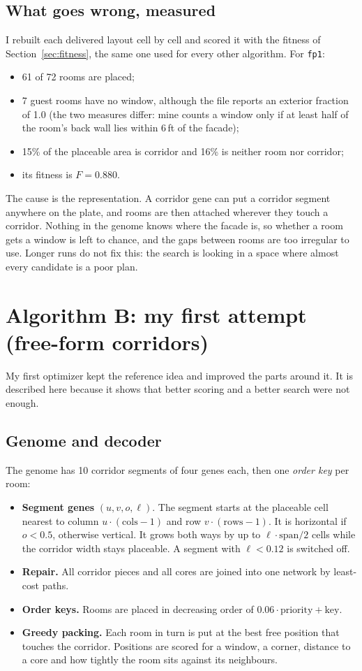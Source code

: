 \documentclass[10pt,a4paper]{article}
\newcommand{\code}[1]{\texttt{\small #1}}
\begin{document}
\subsection{What goes wrong, measured}
I rebuilt each delivered layout cell by cell and scored it with the fitness of Section~\ref{sec:fitness}, the same one
used for every other algorithm. For \code{fp1}:
\begin{itemize}
\item 61 of 72 rooms are placed;
\item 7 guest rooms have no window, although the file reports an exterior fraction of 1.0
(the two measures differ: mine counts a window only if at least half of the room's back wall lies within 6\,ft of
the facade);
\item 15\% of the placeable area is corridor and 16\% is neither room nor corridor;
\item its fitness is $F = 0.880$.
\end{itemize}
The cause is the representation. A corridor gene can put a corridor segment anywhere on the plate, and rooms are then
attached wherever they touch a corridor. Nothing in the genome knows where the facade is, so whether a room gets a
window is left to chance, and the gaps between rooms are too irregular to use. Longer runs do not fix this:
the search is looking in a space where almost every candidate is a poor plan.


\section{Algorithm B: my first attempt (free-form corridors)}\label{sec:free}
My first optimizer kept the reference idea and improved the parts around it. It is described here because it shows
that better scoring and a better search were not enough.

\subsection{Genome and decoder}
The genome has 10 corridor segments of four genes each, then one \emph{order key} per room:
\begin{itemize}
\item \textbf{Segment genes} $(u, v, o, \ell)$. The segment starts at the placeable cell nearest to column $u \cdot
(\text{cols}-1)$ and row $v \cdot (\text{rows}-1)$. It is horizontal if $o < 0.5$, otherwise vertical. It grows both
ways by up to $\ell \cdot \text{span}/2$ cells while the corridor width stays placeable. A segment with $\ell < 0.12$
is switched off.
\item \textbf{Repair.} All corridor pieces and all cores are joined into one network by least-cost paths.
\item \textbf{Order keys.} Rooms are placed in decreasing order of $0.06 \cdot \text{priority} + \text{key}$.
\item \textbf{Greedy packing.} Each room in turn is put at the best free position that touches the corridor. Positions
are scored for a window, a corner, distance to a core and how tightly the room sits against its neighbours.
\end{itemize}
\end{document}
